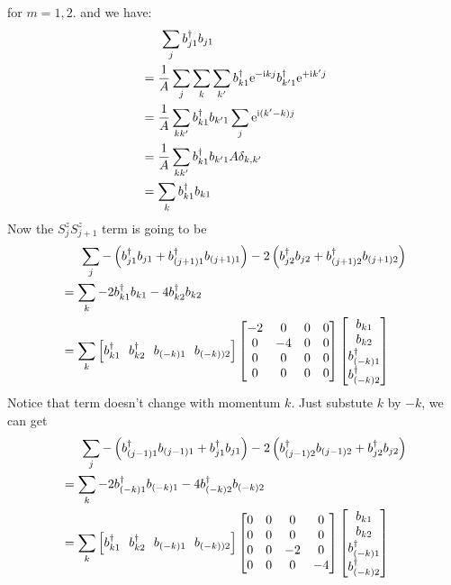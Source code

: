 \documentclass[letter]{article}
\newcommand{\e}{\mathrm{e}}
\newcommand{\ii}{\mathrm{i}}
\begin{document}
for $m=1,2$. and we have:
$$\begin{aligned}
&\indent \sum_j b_{j1}^{\dagger}b_{j1} \\
&=\frac{1}{A}\sum_{j}\sum_{k}\sum_{k'}b_{k1}^{\dagger}\e^{-\ii kj}b_{k'1}^{\dagger}\e^{+\ii k'j}\\
&=\frac{1}{A}\sum_{kk'}b_{k1}^{\dagger}b_{k'1}\sum_{j}\e^{\ii(k'-k)j}\\
&=\frac{1}{A}\sum_{kk'}b_{k1}^{\dagger}b_{k'1} A \delta_{k,k'}\\
&=\sum_{k}b_{k1}^{\dagger}b_{k1}
\end{aligned}
$$
Now the $S_j^z S_{j+1}^z$ term is going to be$$\begin{aligned}
& \indent \sum_j -\left(b_{j1}^{\dagger}b_{j1}+b_{(j+1)1}^{\dagger}b_{(j+1)1}\right)-2\left(b_{j2}^{\dagger}b_{j2}+b_{(j+1)2}^{\dagger}b_{(j+1)2}\right)\\
&= \sum_{k}-2b_{k1}^{\dagger}b_{k1}-4b_{k2}^{\dagger}b_{k2}\\
&=\sum_k \left[
    b_{k1}^{\dagger} \ \ 
    b_{k2}^{\dagger}\  \ 
    b_{(-k)1}\ \ 
    b_{(-k))2}\right]
   \begin{bmatrix}
        -2 & 0 & 0 & 0 \\
       0 &  -4 & 0 &0 \\
       0 &  0 & 0 &0\\
        0 & 0 & 0& 0
        \end{bmatrix}\begin{bmatrix}
            b_{k1}  \\
            b_{k2}  \\
            b_{(-k)1}^{\dagger}\\
            b_{(-k)2}^{\dagger}
            \end{bmatrix}
\end{aligned}
$$
Notice that term doesn't change with momentum $k$. Just substute $k$ by $-k$, we can get $$\begin{aligned}
    & \indent \sum_j -\left(b_{(j-1)1}^{\dagger}b_{(j-1)1}+b_{j1}^{\dagger}b_{j1}\right)-2\left(b_{(j-1)2}^{\dagger}b_{(j-1)2}+b_{j2}^{\dagger}b_{j2}\right)\\
    &= \sum_{k}-2b_{(-k)1}^{\dagger}b_{(-k)1}-4b_{(-k)2}^{\dagger}b_{(-k)2}\\
    &=\sum_k \left[
        b_{k1}^{\dagger} \ \ 
        b_{k2}^{\dagger}\  \ 
        b_{(-k)1}\ \ 
        b_{(-k))2}\right]
       \begin{bmatrix}
            0 & 0 & 0 & 0 \\
           0 &  0 & 0 &0 \\
           0 &  0 & -2 &0\\
            0 & 0 & 0& -4
            \end{bmatrix}\begin{bmatrix}
                b_{k1}  \\
                b_{k2}  \\
                b_{(-k)1}^{\dagger}\\
                b_{(-k)2}^{\dagger}
                \end{bmatrix}
    \end{aligned}
    $$\\
\end{document}
